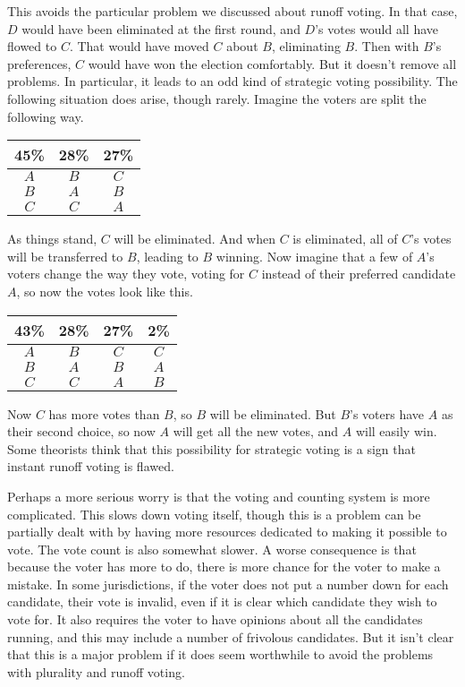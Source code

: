 \documentclass[11pt,]{article}
\begin{document}
This avoids the particular problem we discussed about runoff voting. In
that case, \(D\) would have been eliminated at the first round, and
\(D\)'s votes would all have flowed to \(C\). That would have moved
\(C\) about \(B\), eliminating \(B\). Then with \(B\)'s preferences,
\(C\) would have won the election comfortably. But it doesn't remove all
problems. In particular, it leads to an odd kind of strategic voting
possibility. The following situation does arise, though rarely. Imagine
the voters are split the following way.

\begin{longtable}[]{@{}ccc@{}}
\toprule
45\% & 28\% & 27\%\tabularnewline
\midrule
\endhead
\(A\) & \(B\) & \(C\)\tabularnewline
\(B\) & \(A\) & \(B\)\tabularnewline
\(C\) & \(C\) & \(A\)\tabularnewline
\bottomrule
\end{longtable}

As things stand, \(C\) will be eliminated. And when \(C\) is eliminated,
all of \(C\)'s votes will be transferred to \(B\), leading to \(B\)
winning. Now imagine that a few of \(A\)'s voters change the way they
vote, voting for \(C\) instead of their preferred candidate \(A\), so
now the votes look like this.

\begin{longtable}[]{@{}cccc@{}}
\toprule
43\% & 28\% & 27\% & 2\%\tabularnewline
\midrule
\endhead
\(A\) & \(B\) & \(C\) & \(C\)\tabularnewline
\(B\) & \(A\) & \(B\) & \(A\)\tabularnewline
\(C\) & \(C\) & \(A\) & \(B\)\tabularnewline
\bottomrule
\end{longtable}

Now \(C\) has more votes than \(B\), so \(B\) will be eliminated. But
\(B\)'s voters have \(A\) as their second choice, so now \(A\) will get
all the new votes, and \(A\) will easily win. Some theorists think that
this possibility for strategic voting is a sign that instant runoff
voting is flawed.

Perhaps a more serious worry is that the voting and counting system is
more complicated. This slows down voting itself, though this is a
problem can be partially dealt with by having more resources dedicated
to making it possible to vote. The vote count is also somewhat slower. A
worse consequence is that because the voter has more to do, there is
more chance for the voter to make a mistake. In some jurisdictions, if
the voter does not put a number down for each candidate, their vote is
invalid, even if it is clear which candidate they wish to vote for. It
also requires the voter to have opinions about all the candidates
running, and this may include a number of frivolous candidates. But it
isn't clear that this is a major problem if it does seem worthwhile to
avoid the problems with plurality and runoff voting.
\end{document}
